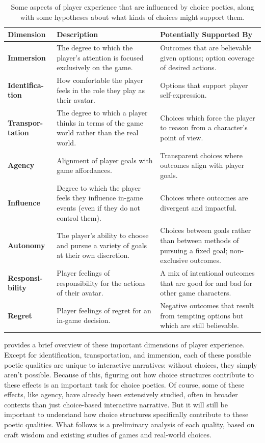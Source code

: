 \begin{table}[!p]
\begingroup
\renewcommand*{\arraystretch}{1.5}
\begin{tabular}{p{5.5em}p{14em}p{13.5em}}
\toprule
\textbf{Dimension} & \textbf{Description} & \textbf{Potentially Supported By} \\
\midrule
\textbf{Immersion} & The degree to which the player's attention is focused exclusively on the game. & Outcomes that are believable given options; option coverage of desired actions. \\
\textbf{Identifica-tion} & How comfortable the player feels in the role they play as their avatar. & Options that support player self-expression. \\
\textbf{Transpor-tation} & The degree to which a player thinks in terms of the game world rather than the real world. & Choices which force the player to reason from a character's point of view. \\
\textbf{Agency} & Alignment of player goals with game affordances. & Transparent choices where outcomes align with player goals.\\
\textbf{Influence} & Degree to which the player feels they influence in-game events (even if they do not control them). & Choices where outcomes are divergent and impactful. \\
\textbf{Autonomy} & The player's ability to choose and pursue a variety of goals at their own discretion. & Choices between goals rather than between methods of pursuing a fixed goal; non-exclusive outcomes. \\
\textbf{Responsi-bility} & Player feelings of responsibility for the actions of their avatar. & A mix of intentional outcomes that are good for and bad for other game characters. \\
\textbf{Regret} & Player feelings of regret for an in-game decision. & Negative outcomes that result from tempting options but which are still believable. \\
\bottomrule
\end{tabular}
\endgroup
\caption[Dimensions of player experience]{Some aspects of player experience that are influenced by choice poetics, along with some hypotheses about what kinds of choices might support them.}
\label{tab:dimensions-of-experience}
\end{table}

 provides a brief overview of these important dimensions of player experience.
%
Except for identification, transportation, and immersion, each of these possible poetic qualities are unique to interactive narratives: without choices, they simply aren't possible.
%
Because of this, figuring out how choice structures contribute to these effects 
is an important task for choice poetics.
%
Of course, some of these effects, like agency, have already been extensively studied, often in broader contexts than just choice-based interactive narrative.
%
But it will still be important to understand how choice structures specifically contribute to these poetic qualities.
%
What follows is a preliminary analysis of each quality, based on craft wisdom and existing studies of games and real-world choices.

